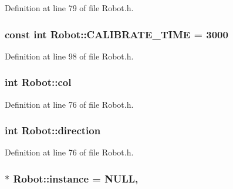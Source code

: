 Definition at line 79 of file Robot.\-h.

\hypertarget{classRobot_ac40abfa06749a68604af90c00e2a3fee}{
\subsubsection[{C\-A\-L\-I\-B\-R\-A\-T\-E\-\_\-\-T\-I\-M\-E}]{\setlength{\rightskip}{0pt plus 5cm}const int Robot\-::\-C\-A\-L\-I\-B\-R\-A\-T\-E\-\_\-\-T\-I\-M\-E = 3000\hspace{0.3cm}{\ttfamily [static]}}}\label{classRobot_ac40abfa06749a68604af90c00e2a3fee}


Definition at line 98 of file Robot.\-h.

\hypertarget{classRobot_a2e08d53491bb82defe2e28ee9ce1d096}{
\subsubsection[{col}]{\setlength{\rightskip}{0pt plus 5cm}int Robot\-::col}}\label{classRobot_a2e08d53491bb82defe2e28ee9ce1d096}


Definition at line 76 of file Robot.\-h.

\hypertarget{classRobot_ac25b4dfc2e9e5aa86ec5684d075d32b8}{
\subsubsection[{direction}]{\setlength{\rightskip}{0pt plus 5cm}int Robot\-::direction}}\label{classRobot_ac25b4dfc2e9e5aa86ec5684d075d32b8}


Definition at line 76 of file Robot.\-h.

\hypertarget{classRobot_aad5c5d6db601aac62393d47ec9385fa3}{
\subsubsection[{instance}]{ $\ast$ Robot\-::instance = N\-U\-L\-L\hspace{0.3cm}{\ttfamily [static]}, {\ttfamily [private]}}}\label{classRobot_aad5c5d6db601aac62393d47ec9385fa3}


